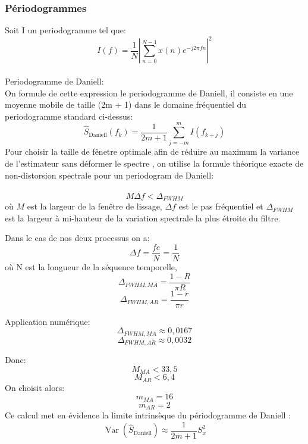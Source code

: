 \documentclass[11pt,a4paper]{article}
\begin{document}
\subsubsection{Périodogrammes}
Soit I un periodogramme tel que: \\
\begin{equation}
    I(f) = \frac{1}{N} \left| \sum_{n=0}^{N-1} x(n) e^{-j 2 \pi f n} \right|^2
\end{equation}
\\
    \indent Periodogramme de Daniell:
\\
    On formule de cette expression le periodogramme de Daniell, il consiste en une moyenne mobile de taille (2m + 1) dans le domaine fréquentiel du periodogramme standard ci-dessus:
\\
\begin{equation}
    \hat{S}_{\text{Daniell}}(f_k) = \frac{1}{2m + 1} \sum_{j = -m}^{m} I(f_{k + j})
\end{equation}
Pour choisir la taille de fênetre optimale afin de réduire au maximum la variance de l'estimateur sans déformer le spectre , on utilise la formule théorique exacte de non-distorsion spectrale pour un periodogram de Daniell: \\ \\
\begin{equation}
    {M}{\Delta f}<{\Delta_{FWHM}}
\end{equation}
où ${M}$ est la largeur de la fenêtre de lissage, ${\Delta f}$ est le pas fréquentiel et  $\Delta_{FWHM}$ est la largeur à mi-hauteur de la variation spectrale la plus étroite du filtre. 

Dans le cas de nos deux processus on a:
    $$\Delta f = \frac{fe}{N} = \frac{1}{N}$$
    où N est la longueur de la séquence temporelle,
\begin{equation}
    \Delta_{FWHM,MA}=\frac{1-R}{\pi R}
\end{equation}
\begin{equation}
    \Delta_{FWHM,AR}=\frac{1-r}{\pi r}
\end{equation}

Application numérique:
    $$\Delta_{FWHM,MA} \approx 0,0167$$
    $$\Delta_{FWHM,AR} \approx 0,0032$$

Donc:
    $$M_{MA}<33,5$$
    $$M_{AR}<6,4$$
On choisit alors:
    $$m_{MA} = 16$$
    $$m_{AR} = 2$$
Ce calcul met en évidence la limite intrinsèque du périodogramme de Daniell :\\
\begin{equation}
    \operatorname{Var}(\hat{S}_{\text{Daniell}}) \approx \frac{1}{2m+1} S_x^2
\end{equation}
\end{document}
